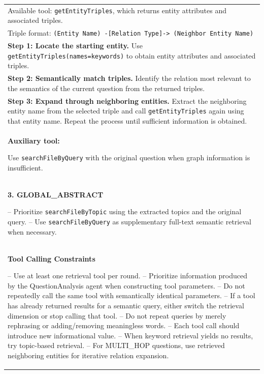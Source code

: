 {\begin{longtable}{@{}p{}@{}}
Available tool: \texttt{getEntityTriples}, which returns entity attributes and associated triples. \\

Triple format:\newline
\texttt{(Entity Name) -[Relation Type]-> (Neighbor Entity Name)} \\

\textbf{Step 1: Locate the starting entity.}\newline
Use \texttt{getEntityTriples(names=keywords)} to obtain entity attributes and associated triples. \\

\textbf{Step 2: Semantically match triples.}\newline
Identify the relation most relevant to the semantics of the current question from the returned triples. \\

\textbf{Step 3: Expand through neighboring entities.}\newline
Extract the neighboring entity name from the selected triple and call \texttt{getEntityTriples} again using that entity name. Repeat the process until sufficient information is obtained.\\

\textbf{Auxiliary tool:}\par
Use \texttt{searchFileByQuery} with the original question when graph information is insufficient.
\\

\textbf{3. GLOBAL\_ABSTRACT}\par

-- Prioritize \texttt{searchFileByTopic} using the extracted topics and the original query.\newline
-- Use \texttt{searchFileByQuery} as supplementary full-text semantic retrieval when necessary.
\\

\textbf{Tool Calling Constraints}\par

-- Use at least one retrieval tool per round.\newline
-- Prioritize information produced by the QuestionAnalysis agent when constructing tool parameters.\newline
-- Do not repeatedly call the same tool with semantically identical parameters.\newline
-- If a tool has already returned results for a semantic query, either switch the retrieval dimension or stop calling that tool.\newline
-- Do not repeat queries by merely rephrasing or adding/removing meaningless words.\newline
-- Each tool call should introduce new informational value.\newline
-- When keyword retrieval yields no results, try topic-based retrieval.\newline
-- For MULTI\_HOP questions, use retrieved neighboring entities for iterative relation expansion.
\\



\end{longtable}}

